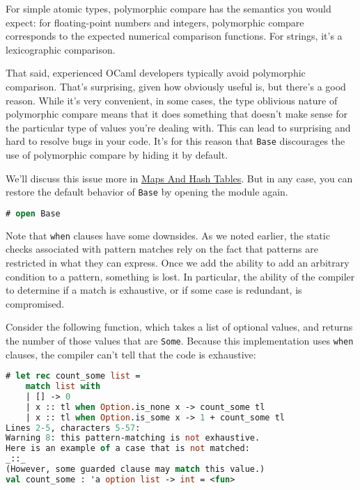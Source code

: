 For simple atomic types, polymorphic compare has the semantics you would
expect: for floating-point numbers and integers, polymorphic compare
corresponds to the expected numerical comparison functions. For strings,
it's a lexicographic comparison.

That said, experienced OCaml developers typically avoid polymorphic
comparison. That's surprising, given how obviously useful is, but
there's a good reason. While it's very convenient, in some cases, the
type oblivious nature of polymorphic compare means that it does
something that doesn't make sense for the particular type of values
you're dealing with. This can lead to surprising and hard to resolve
bugs in your code. It's for this reason that
\passthrough{\lstinline!Base!} discourages the use of polymorphic
compare by hiding it by default.

We'll discuss this issue more in
\href{maps-and-hashtables.html\#maps-and-hash-tables}{Maps And Hash
Tables}. But in any case, you can restore the default behavior of
\passthrough{\lstinline!Base!} by opening the module again.

\begin{lstlisting}[language=Caml]
# open Base
\end{lstlisting}

Note that \passthrough{\lstinline!when!} clauses have some downsides. As
we noted earlier, the static checks associated with pattern matches rely
on the fact that patterns are restricted in what they can express. Once
we add the ability to add an arbitrary condition to a pattern, something
is lost. In particular, the ability of the compiler to determine if a
match is exhaustive, or if some case is redundant, is compromised.

Consider the following function, which takes a list of optional values,
and returns the number of those values that are
\passthrough{\lstinline!Some!}. Because this implementation uses
\passthrough{\lstinline!when!} clauses, the compiler can't tell that the
code is exhaustive:

\begin{lstlisting}[language=Caml]
# let rec count_some list =
    match list with
    | [] -> 0
    | x :: tl when Option.is_none x -> count_some tl
    | x :: tl when Option.is_some x -> 1 + count_some tl
Lines 2-5, characters 5-57:
Warning 8: this pattern-matching is not exhaustive.
Here is an example of a case that is not matched:
_::_
(However, some guarded clause may match this value.)
val count_some : 'a option list -> int = <fun>
\end{lstlisting}

